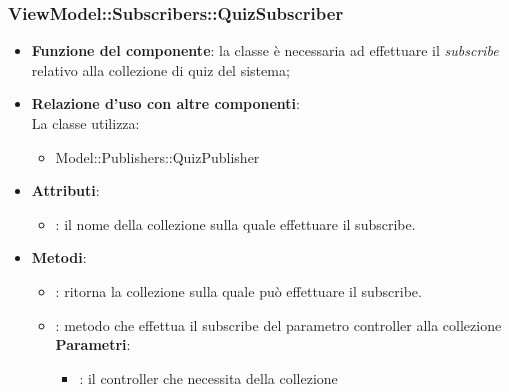 \subsubsection{ViewModel::Subscribers::QuizSubscriber}
\begin{itemize}
\item\textbf{Funzione del componente}: la classe è necessaria ad effettuare il \emph{subscribe} relativo alla collezione di quiz del sistema;
	\item\textbf{Relazione d'uso con altre componenti}:\\
La classe utilizza:
	\begin{itemize}
		\item Model::Publishers::QuizPublisher
	\end{itemize}
\item\textbf{Attributi}:
	\begin{itemize}
		\item{}: il nome della collezione sulla quale effettuare il subscribe.\\	
	\end{itemize}
\item\textbf{Metodi}:
	\begin{itemize}
		\item{}: ritorna la collezione sulla quale può effettuare il subscribe.\\
		\item{}: metodo che effettua il subscribe del parametro controller alla collezione\\
		\textbf{Parametri}:
			\begin{itemize}
				\item{}: il controller che necessita della collezione\\
			\end{itemize}
	\end{itemize}
\end{itemize}

